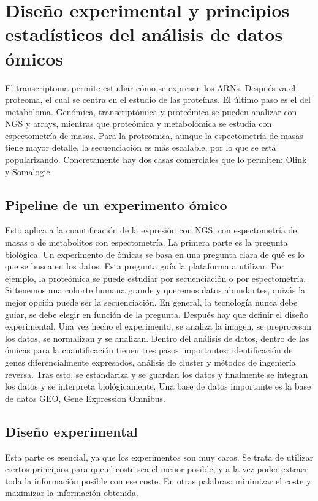 \chapter{Diseño experimental y principios estadísticos del análisis de datos ómicos}
El transcriptoma permite estudiar cómo se expresan los ARNs. Después va el proteoma, el cual se centra en el estudio de las proteínas. El último paso es el del metaboloma. Genómica, transcriptómica y proteómica se pueden analizar con NGS y arrays, mientras que proteómica y metabolómica se estudia con espectometría de masas. Para la proteómica, aunque la espectometría de masas tiene mayor detalle, la secuenciación es más escalable, por lo que se está popularizando. Concretamente hay dos casas comerciales que lo permiten: Olink y Somalogic. 

\section{Pipeline de un experimento ómico}
Esto aplica a la cuantificación de la expresión con NGS, con espectometría de masas o de metabolitos con espectometría. La primera parte es la pregunta biológica. Un experimento de ómicas se basa en una pregunta clara de qué es lo que se busca en los datos. 
Esta pregunta guía la plataforma a utilizar. Por ejemplo, la proteómica se puede estudiar por secuenciación o por espectometría. Si tenemos una cohorte humana grande y queremos datos abundantes, quizás la mejor opción puede ser la secuenciación. En general, la tecnología nunca debe guiar, se debe elegir en función de la pregunta. Después hay que definir el diseño experimental. Una vez hecho el experimento, se analiza la imagen, se preprocesan los datos, se normalizan y se analizan. Dentro del análisis de datos, dentro de las ómicas para la cuantificación tienen tres pasos importantes: identificación de genes diferencialmente expresados, análisis de cluster y métodos de ingeniería reversa. Tras esto, se estandariza y se guardan los datos y finalmente se integran los datos y se interpreta biológicamente. Una base de datos importante es la base de datos GEO, Gene Expression Omnibus. 

\section{Diseño experimental}
Esta parte es esencial, ya que los experimentos son muy caros. Se trata de utilizar ciertos principios para que el coste sea el menor posible, y a la vez poder extraer toda la información posible con ese coste. En otras palabras: minimizar el coste y maximizar la información obtenida.

